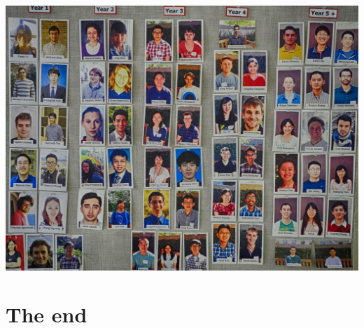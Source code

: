 \documentclass{beamer}
\begin{document}
\begin{frame}
\begin{center}
\includegraphics[scale = 0.09]{DSCN3957-HDR.jpg}
\end{center}
\end{frame}

\section*{The end}

\begin{frame}
\sectionpage
\end{frame}
\end{document}
